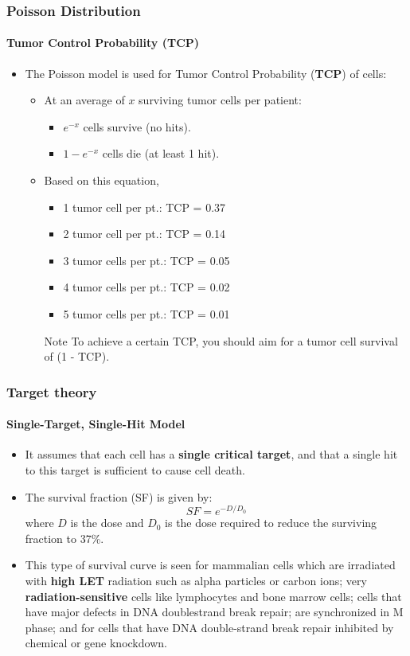 \documentclass{beamer}
\begin{document}
\begin{frame}
  \frametitle{Poisson Distribution}
  \framesubtitle{Tumor Control Probability (TCP)}
  \begin{itemize}
    \item The Poisson model is used for Tumor Control Probability (\textbf{TCP}) of cells:
    \begin{itemize}
      \item At an average of $x$ surviving tumor cells per patient:
        \begin{itemize}
          \item $e^{-x}$ cells survive (no hits).
          \item $1 - e^{-x}$ cells die (at least 1 hit).
        \end{itemize}
      \item Based on this equation,
        \begin{itemize}
          \item 1 tumor cell per pt.: TCP = 0.37
          \item 2 tumor cell per pt.: TCP = 0.14
          \item 3 tumor cells per pt.: TCP = 0.05
          \item 4 tumor cells per pt.: TCP = 0.02
          \item 5 tumor cells per pt.: TCP = 0.01
        \end{itemize}
        \begin{block}{Note}
          To achieve a certain TCP, you should aim for a tumor cell  survival of (1 - TCP).
        \end{block}
    \end{itemize}
  \end{itemize}

\end{frame}


\begin{frame}
  \frametitle{Target theory}
  \framesubtitle{Single-Target, Single-Hit Model}
  \begin{itemize}
    \item It assumes that each cell has a \textbf{single critical target}, and that a single hit to this target is sufficient to cause cell death.
    \item The survival fraction (SF) is given by:
      $$SF = e^{-D/D_0}$$
      where $D$ is the dose and $D_0$ is the dose required to reduce the surviving fraction to 37\%.
    \item This type of survival curve is seen for mammalian cells which are irradiated  with \textbf{high LET} radiation such as alpha particles or carbon ions; very \textbf{radiation-sensitive} cells like lymphocytes and bone marrow cells; cells that have major defects in DNA doublestrand break repair; are synchronized in M phase; and for cells that have DNA double-strand break repair inhibited by chemical or gene knockdown.
  \end{itemize}
\end{frame}
\end{document}
